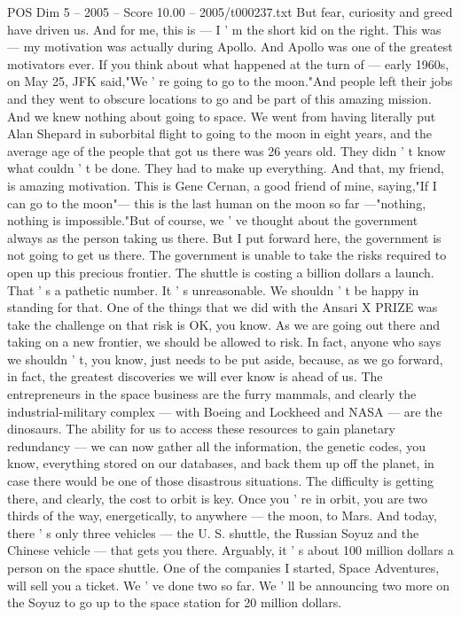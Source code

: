 \begin{textsample}{POS Dim 5 – 2005 – Score 10.00 – 2005/t000237.txt}
But fear, curiosity and greed have driven us.
And for me, this is — I ' m the short kid on the right.
This was — my motivation was actually during Apollo.
And Apollo was one of the greatest motivators ever.
If you think about what happened at the turn of — early 1960s, on May 25, JFK said,"We ' re going to go to the moon."And people left their jobs and they went to obscure locations to go and be part of this amazing mission.
And we knew nothing about going to space.
We went from having literally put Alan Shepard in suborbital flight to going to the moon in eight years, and the average age of the people that got us there was 26 years old.
They didn ' t know what couldn ' t be done.
They had to make up everything.
And that, my friend, is amazing motivation.
This is Gene Cernan, a good friend of mine, saying,"If I can go to the moon"— this is the last human on the moon so far —"nothing, nothing is impossible."But of course, we ' ve thought about the government always as the person taking us there.
But I put forward here, the government is not going to get us there.
The government is unable to take the risks required to open up this precious frontier.
The shuttle is costing a billion dollars a launch.
That ' s a pathetic number.
It ' s unreasonable.
We shouldn ' t be happy in standing for that.
One of the things that we did with the Ansari X PRIZE was take the challenge on that risk is OK, you know.
As we are going out there and taking on a new frontier, we should be allowed to risk.
In fact, anyone who says we shouldn ' t, you know, just needs to be put aside, because, as we go forward, in fact, the greatest discoveries we will ever know is ahead of us.
The entrepreneurs in the space business are the furry mammals, and clearly the industrial-military complex — with Boeing and Lockheed and NASA — are the dinosaurs.
The ability for us to access these resources to gain planetary redundancy — we can now gather all the information, the genetic codes, you know, everything stored on our databases, and back them up off the planet, in case there would be one of those disastrous situations.
The difficulty is getting there, and clearly, the cost to orbit is key.
Once you ' re in orbit, you are two thirds of the way, energetically, to anywhere — the moon, to Mars.
And today, there ' s only three vehicles — the U.
S. shuttle, the Russian Soyuz and the Chinese vehicle — that gets you there.
Arguably, it ' s about 100 million dollars a person on the space shuttle.
One of the companies I started, Space Adventures, will sell you a ticket.
We ' ve done two so far.
We ' ll be announcing two more on the Soyuz to go up to the space station for 20 million dollars.

\end{textsample}
